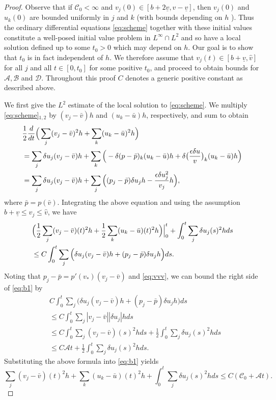 \documentclass[10pt,a4paper]{amsart}
\begin{document}
\begin{proof}
Observe that if \(\mathscr{C}_{0}<\infty\) and $v_{j}(0)\in [b+2\underline{v},\hat{v}-\underline{v}] $, then \(v_j(0)\) and \(u_k(0)\) are bounded uniformly in \(j\) and \(k\) (with bounds depending on \(h\) ). Thus the ordinary  differential equations \eqref{eq:scheme} together with these initial values constitute a well-posed initial value problem in \(L^{\infty}\cap L^{2}\) and so have a local solution defined up to some \(t_0>0\) which may depend on $h$. Our goal is to show that \(t_{0}\) is in fact independent of \(h\). We therefore assume that $v_{j}(t)\in [b+\underline{v},\hat{v}]$ for all $j$ and all $t\in [0,t_0]$ for some positive $t_0$, and proceed to obtain bounds for $\mathscr{A}, \mathscr{B}$ and $\mathscr{D}$. 
Throughout this proof $C$ denotes a generic positive constant as described above. 

We first give the  $L^2$ estimate of the local solution to \eqref{eq:scheme}. We multiply \eqref{eq:scheme}$_{1,2}$ by \((v_j-\bar v)h\) and \((u_k-\bar u)h\), respectively, and sum to obtain
\begin{align*}
\displaystyle  &\frac12\frac{d}{dt}\Big(\sum_{j} (v_j-\bar v)^{2}h+\sum_{k}(u_k-\bar u)^2h\Big)\\&=\sum_{j}\delta u_j(v_j-\bar v)h+\sum_{k}\Big(-\delta(p-\bar p)_k(u_k-\bar u)h+\delta\big(\frac{\epsilon\delta u}{v}\big)_k(u_k-\bar u)h\Big)\\
&=\sum_{j}\delta u_j(v_j-\bar v)h+\sum_{j}\Big((p_j-\bar p)\delta u_jh-\frac{\epsilon\delta u_j^2}{v_j}h\Big),
\end{align*}
where $\bar{p}=p({\bar v})$. Integrating the above equation and using the assumption $b+\underline{v}\leq v_j\leq \hat{v}$, we have
\begin{equation}\label{eq:b1}
\begin{aligned}
\displaystyle  &\Big(\frac12\sum_{j} (v_j-\bar v)(t)^{2}h+\frac12\sum_{k}(u_k-\bar u)(t)^2h\Big)\Big|^t_0+\int_0^t \sum_{j}\delta u_j(s)^2hds\\
&\leq C\int_0^t\sum_{j}\Big(\delta u_j(v_j-\bar v)h+(p_j-\bar p)\delta u_jh\Big)ds.\\
\end{aligned}  
\end{equation}
Noting that \(p_j-\bar p=p'(v_*)(v_j-\bar v)\) and \eqref{eq:vvv}, we can bound the right side of \eqref{eq:b1} by
\[\begin{aligned}
&C\int_0^t\sum_{j}\Big(\delta u_j(v_j-\bar v)h+(p_j-\bar p)\delta u_jh\Big)ds\\& \leq C\int_{0}^{t}\sum_{j}|v_{j}-\bar v||\delta u_j|hds \\&\leq C\int_{0}^{t}\sum_{j}(v_{j}-\bar v)(s)^2hds+\frac12\int_{0}^{t}\sum_{j}\delta u_j(s)^2hds\\&\leq C\mathscr{A}t+\frac12\int_{0}^{t}\sum_{j}\delta u_j(s)^2hds.
\end{aligned}\]
Substituting the above formula into \eqref{eq:b1} yields
\begin{equation}\label{eq:b0}
  \sum_{j}(v_{j}-\bar v)(t)^{2}h+\sum_{k}(u_{k}-\bar u)(t)^{2}h+\int_{0}^{t}\sum\limits_{j}\delta u_{j}(s)^{2}hds\leq C({\mathscr{C}}_{0}+{\mathscr{A}}t).
\end{equation} 


\end{proof}
\end{document}
